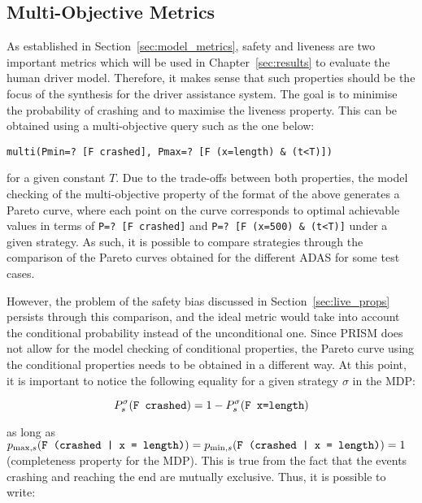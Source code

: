 \subsection{Multi-Objective Metrics}
\label{sec:multi_obj_metrics}

As established in Section~\ref{sec:model_metrics}, safety and liveness are two important metrics which will be used in Chapter~\ref{sec:results} to evaluate the human driver model. Therefore, it makes sense that such properties should be the focus of the synthesis for the driver assistance system. The goal is to minimise the probability of crashing and to maximise the liveness property. This can be obtained using a multi-objective query such as the one below:

\begin{minipage}{\linewidth}
{\vspace{1em}
\begin{lstlisting}
multi(Pmin=? [F crashed], Pmax=? [F (x=length) & (t<T)])
\end{lstlisting}
}
\end{minipage}

for a given constant $T$. Due to the trade-offs between both properties, the model checking of the multi-objective property of the format of the above generates a Pareto curve, where each point on the curve corresponds to optimal achievable values in terms of \texttt{P=? [F crashed]} and \texttt{P=? [F (x=500) \& (t<T)]} under a given strategy. As such, it is possible to compare strategies through the comparison of the Pareto curves obtained for the different ADAS for some test cases.

However, the problem of the safety bias discussed in Section~\ref{sec:live_props} persists through this comparison, and the ideal metric would take into account the conditional probability instead of the unconditional one. Since PRISM does not allow for the model checking of conditional properties, the Pareto curve using the conditional properties needs to be obtained in a different way. At this point, it is important to notice the following equality for a given strategy $\sigma$ in the MDP:

\begin{equation}
	P^{\sigma}_s (\text{\texttt{F crashed}}) = 1 - P^{\sigma}_s (\text{\texttt{F x=length}})
\end{equation}

as long as $p_{\max, s} (\text{\texttt{F (crashed | x = length)}}) = p_{\min, s} (\text{\texttt{F (crashed | x = length)}}) = 1$ (completeness property for the MDP). This is true from the fact that the events crashing and reaching the end are mutually exclusive. Thus, it is possible to write:

